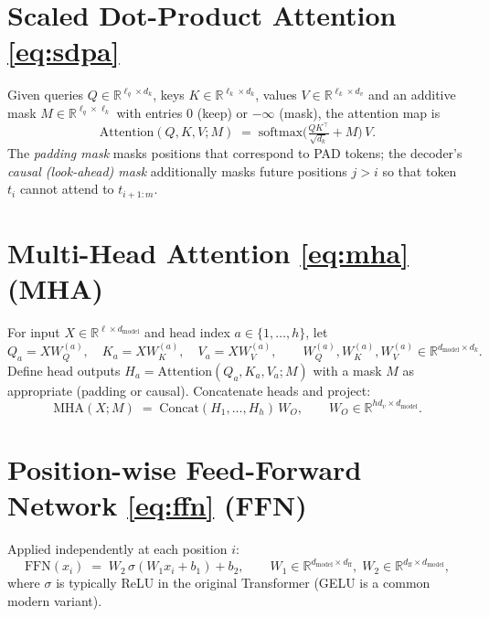 \documentclass[11pt]{article}
\begin{document}
\section{Scaled Dot-Product Attention \eqref{eq:sdpa}}
Given queries $Q\!\in\!\mathbb{R}^{\ell_q\times d_k}$, keys $K\!\in\!\mathbb{R}^{\ell_k\times d_k}$, values $V\!\in\!\mathbb{R}^{\ell_k\times d_v}$ and an additive mask $M\!\in\!\mathbb{R}^{\ell_q\times \ell_k}$ with entries $0$ (keep) or $-\infty$ (mask), the attention map is
\begin{equation}
\mathrm{Attention}(Q,K,V;M) \;=\; \mathrm{softmax}\!\Big(\tfrac{QK^{\top}}{\sqrt{d_k}} + M\Big)\,V. \label{eq:sdpa}
\end{equation}
The \emph{padding mask} masks positions that correspond to PAD tokens; the decoder's \emph{causal (look-ahead) mask} additionally masks future positions $j>i$ so that token $t_i$ cannot attend to $t_{i+1:m}$.

\section{Multi-Head Attention \eqref{eq:mha} (MHA)}
For input $X\!\in\!\mathbb{R}^{\ell\times d_{\text{model}}}$ and head index $a\in\{1,\dots,h\}$, let
\begin{equation}
Q_a = X W_Q^{(a)},\quad K_a = X W_K^{(a)},\quad V_a = X W_V^{(a)},\qquad
W_Q^{(a)},W_K^{(a)},W_V^{(a)} \in \mathbb{R}^{d_{\text{model}}\times d_k}.
\label{eq:qkv_self}
\end{equation}
Define head outputs $H_a = \mathrm{Attention}(Q_a,K_a,V_a;M)$ with a mask $M$ as appropriate (padding or causal). Concatenate heads and project:
\begin{equation}
\mathrm{MHA}(X;M) \;=\; \mathrm{Concat}(H_1,\dots,H_h)\,W_O,\qquad W_O\in\mathbb{R}^{hd_v\times d_{\text{model}}}. \label{eq:mha}
\end{equation}

\section{Position-wise Feed-Forward Network \eqref{eq:ffn} (FFN)}
Applied independently at each position $i$:
\begin{equation}
\mathrm{FFN}(x_i) \;=\; W_2\,\sigma(W_1 x_i + b_1) + b_2,\qquad
W_1\in\mathbb{R}^{d_{\text{model}}\times d_{\text{ff}}},\;W_2\in\mathbb{R}^{d_{\text{ff}}\times d_{\text{model}}},
\label{eq:ffn}
\end{equation}
where $\sigma$ is typically ReLU in the original Transformer (GELU is a common modern variant).
\end{document}
